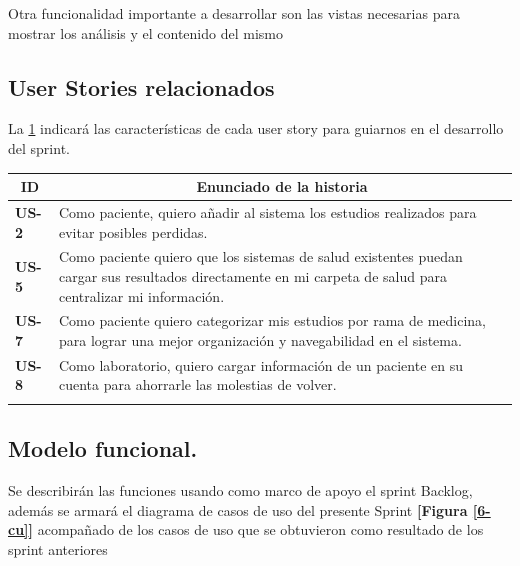 \documentclass[a4paper,12pt]{article}
\begin{document}
Otra funcionalidad importante a desarrollar son las vistas necesarias para mostrar los análisis y el contenido del mismo

\subsection{User Stories relacionados}
La  \ref{sprint-6} indicará las características de cada user story para guiarnos en el desarrollo del sprint.

\begin{table}[h]

    \centering
	\begin{tabular}{|l|p{9cm}|}
	\hline
        \multicolumn{1}{|c|}{\textbf{ID}} &
        \multicolumn{1}{|c|}{\textbf{Enunciado de la historia}} \\          
    \hline
        \textbf{US-2 } & Como paciente, quiero añadir al sistema los estudios realizados para evitar posibles perdidas.\\
     \hline 
        \textbf{US-5 } & Como paciente quiero que los sistemas de salud existentes puedan cargar sus resultados directamente en mi carpeta de salud para centralizar mi información. \\
      \hline 
        \textbf{US-7} & Como paciente quiero categorizar mis estudios por rama de medicina, para lograr una mejor organización y navegabilidad en el sistema. \\
       \hline 
        \textbf{US-8} & Como laboratorio, quiero cargar información de un paciente en su cuenta para ahorrarle las molestias de volver. \\
        \\
    \hline 

    \end{tabular}
    \label{sprint-6}
\end{table}

\subsection{ Modelo funcional.} %
Se describirán las funciones usando como marco de apoyo el sprint Backlog, además se armará el diagrama de casos de uso del presente Sprint \textbf{[Figura \ref{6-cu}]} acompañado de los casos de uso que se obtuvieron como resultado de los sprint anteriores
\end{document}
